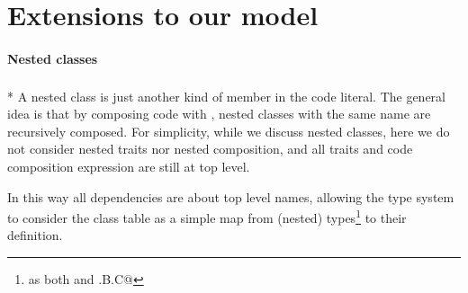 \section{Extensions to our model}

\paragraph{Nested classes}${}_{}$\\*
A nested class is just another kind of member in the code literal.
The general idea is that by composing code with \use,
nested classes with the same name are recursively composed.
For simplicity, while we discuss nested classes,
here we do not consider nested traits nor nested composition,
and all traits and code composition expression are still at top level.

In this way all dependencies are about top level names, allowing the type system 
to consider the class table as a simple map from (nested) types\footnote{
as both \Q@A@ and \Q@A.B.C@}  to their definition.





